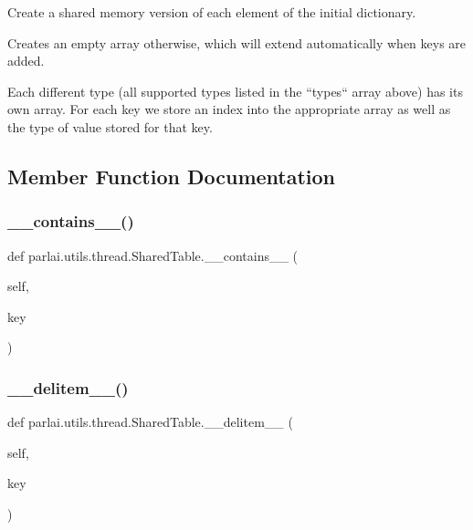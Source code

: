 \begin{DoxyVerb}Create a shared memory version of each element of the initial dictionary.

Creates an empty array otherwise, which will extend
automatically when keys are added.

Each different type (all supported types listed in the ``types`` array
above) has its own array. For each key we store an index into the
appropriate array as well as the type of value stored for that key.
\end{DoxyVerb}
 

\subsection{Member Function Documentation}
\mbox{\label{classparlai_1_1utils_1_1thread_1_1SharedTable_afac82c3717ad0344c5bdfc7b8913d796}} 
\subsubsection{\texorpdfstring{\+\_\+\+\_\+contains\+\_\+\+\_\+()}{\_\_contains\_\_()}}
{\footnotesize\ttfamily def parlai.\+utils.\+thread.\+Shared\+Table.\+\_\+\+\_\+contains\+\_\+\+\_\+ (\begin{DoxyParamCaption}\item[{}]{self,  }\item[{}]{key }\end{DoxyParamCaption})}

\mbox{\label{classparlai_1_1utils_1_1thread_1_1SharedTable_a567947ad20bdc1ad18815fc1883ea247}} 
\subsubsection{\texorpdfstring{\+\_\+\+\_\+delitem\+\_\+\+\_\+()}{\_\_delitem\_\_()}}
{\footnotesize\ttfamily def parlai.\+utils.\+thread.\+Shared\+Table.\+\_\+\+\_\+delitem\+\_\+\+\_\+ (\begin{DoxyParamCaption}\item[{}]{self,  }\item[{}]{key }\end{DoxyParamCaption})}

